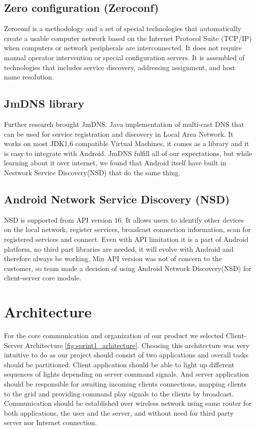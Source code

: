 \subsection {Zero configuration (Zeroconf)}
Zeroconf is a methodology and a set of special technologies that automatically create a usable computer network based on the Internet Protocol Suite (TCP/IP) when computers or network peripherals are interconnected. 
It does not require manual operator intervention or special configuration servers.
It is assembled of technologies that includes service discovery, addressing assignment, and host name resolution.


\subsection{JmDNS library}
Further research brought JmDNS. 
Java implementation of multi-cast DNS that can be used for service registration and discovery in Local Area Network. 
It works on most JDK1.6 compatible Virtual Machines, it comes as a library and it is easy to integrate with Android. 
JmDNS fulfill all of our expectations, but while learning about it over internet, we found that Android itself have built in Nestwork Service Discovery(NSD) that do the same thing.

\subsection{Android Network Service Discovery (NSD)}
NSD is supported from API version 16. 
It allows users to identify other devices on the local network, register services, broadcast connection information, scan for registered services and connect.
Even with API limitation it is a part of Android platform, no third part libraries are needed, it will evolve with Android and therefore always be working.
Min API version was not of concern to the customer, so team made a decision of using Android Network Discovery(NSD) for client-server core module.

\section{Architecture}
For the core communication and organization of our product we selected Client-Server Architecture \ref{fig:sprint1_arhitecture}.
Choosing this architecture was very intuitive to do as our project should consist of two applications and overall tasks should be partitioned. 
Client application should be able to light up different sequences of lights depending on server command signals.
And server application should be responsible for awaiting incoming clients connections, mapping clients to the grid and providing command play signals to the clients by broadcast.
Communication should be established over wireless network using same router for both applications, the user and the server, and without need for third party server nor Internet connection. 

